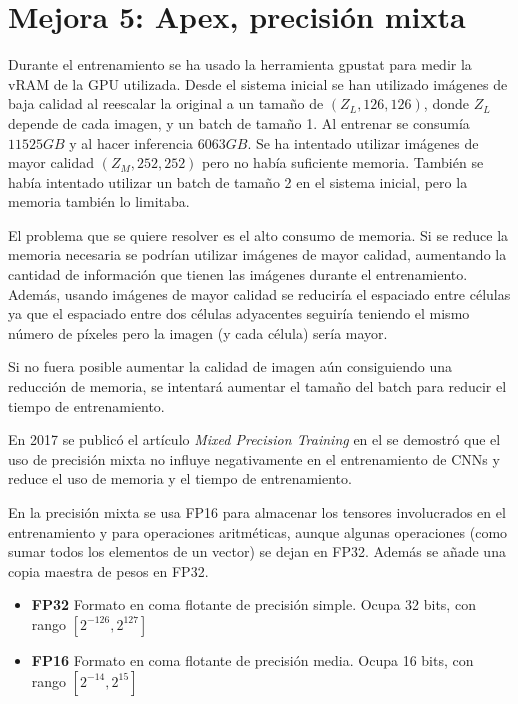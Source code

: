 \chapter{Mejora 5: Apex, precisión mixta}\label{apex}

Durante el entrenamiento se ha usado la herramienta gpustat \cite{wookayin} para medir la vRAM de la GPU utilizada. Desde el sistema inicial se han utilizado imágenes de baja calidad al reescalar la original a un tamaño de $(Z_L, 126, 126)$, donde $Z_L$ depende de cada imagen, y un batch de tamaño 1. Al entrenar se consumía $11525GB$ y al hacer inferencia $6063GB$. Se ha intentado utilizar imágenes de mayor calidad $(Z_M, 252, 252)$ pero no había suficiente memoria. También se había intentado utilizar un batch de tamaño 2 en el sistema inicial, pero la memoria también lo limitaba.

El problema que se quiere resolver es el alto consumo de memoria. Si se reduce la memoria necesaria se podrían utilizar imágenes de mayor calidad, aumentando la cantidad de información que tienen las imágenes durante el entrenamiento. Además, usando imágenes de mayor calidad se reduciría el espaciado entre células ya que el espaciado entre dos células adyacentes seguiría teniendo el mismo número de píxeles pero la imagen (y cada célula) sería mayor.

Si no fuera posible aumentar la calidad de imagen aún consiguiendo una reducción de memoria, se intentará aumentar el tamaño del batch para reducir el tiempo de entrenamiento.

En 2017 se publicó el artículo \textit{Mixed Precision Training} en el se demostró que el uso de precisión mixta no influye negativamente en el entrenamiento de CNNs \cite{Micikevicius2018} y reduce el uso de memoria y el tiempo de entrenamiento.

En la precisión mixta se usa FP16 para almacenar los tensores involucrados en el entrenamiento y para operaciones aritméticas, aunque algunas operaciones (como sumar todos los elementos de un vector) se dejan en FP32. Además se añade una copia maestra de pesos en FP32.

\begin{itemize}
\item \textbf{FP32} Formato en coma flotante de precisión simple. Ocupa 32 bits, con rango $[2^{-126},2^{127}]$
\item \textbf{FP16} Formato en coma flotante de precisión media. Ocupa 16 bits, con rango $[2^{-14},2^{15}]$
\end{itemize}

